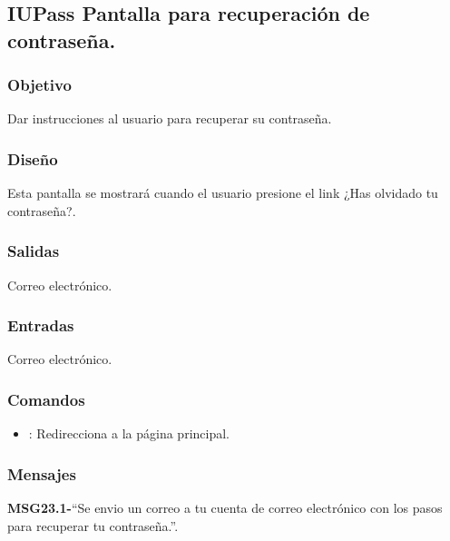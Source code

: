 
\subsection{IUPass Pantalla para recuperación de contraseña.}

\subsubsection{Objetivo}
	Dar instrucciones al usuario para recuperar su contraseña.

\subsubsection{Diseño}
	Esta pantalla se mostrará cuando el usuario presione el link ¿Has olvidado tu contraseña?.


\subsubsection{Salidas}

	Correo electrónico.

\subsubsection{Entradas}
	Correo electrónico.

\subsubsection{Comandos}
\begin{itemize}
	\item {}: Redirecciona a la página principal.
\end{itemize}

\subsubsection{Mensajes}
	\begin{Citemize}
		\item {\bf MSG23.1-}``Se envio un correo a tu cuenta de correo electrónico con los pasos para recuperar tu contraseña.''.
	\end{Citemize}